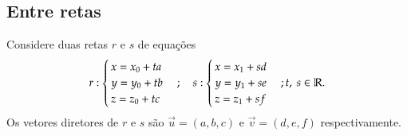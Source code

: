 \subsection{Entre retas} %
\label{sub:entre_retas}
Considere duas retas $r$ e $s$ de equa\c{c}\~oes
\[
    r: \begin{cases}
        x = x_0 + ta\\
        y = y_0 + tb\\
        z = z_0 + tc
    \end{cases}; \quad s: \begin{cases}
        x = x_1 + sd\\
        y = y_1 + se\\
        z = z_1 + sf
    \end{cases}; t,\ s \in \mathbb{R}.
\]
Os vetores diretores de $r$ e $s$ s\~ao $\vec{u} = (a,b,c)$ e $\vec{v} = (d,e,f)$ respectivamente.
